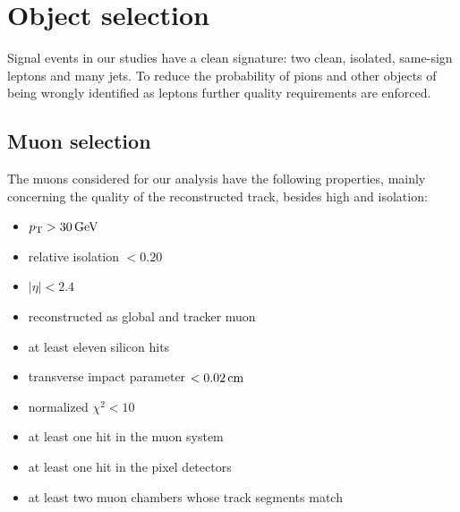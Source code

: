 \section{Object selection}
Signal events in our studies have a clean signature: two clean, isolated,
same-sign leptons and many jets. To reduce the probability of pions and
other objects of being wrongly identified as leptons further quality
requirements are enforced.
\subsection{Muon selection}\label{sec:muon_selection}
The muons considered for our analysis have the following properties, mainly
concerning the quality of the reconstructed track, besides high \pt and
isolation:
\begin{itemize}
    \item $\pt > \unit[30]{GeV}$
    \item relative isolation $< 0.20$
    \item $|\eta| < 2.4$
    \item reconstructed as global and tracker muon
    \item at least eleven silicon hits
    \item transverse impact parameter $< \unit[0.02]{cm}$
    \item normalized $\chi^2 < 10$
    \item at least one hit in the muon system
    \item at least one hit in the pixel detectors
    \item at least two muon chambers whose track segments match
\end{itemize}

